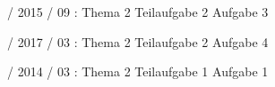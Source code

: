 \documentclass{lehramt-informatik}
\begin{document}
%

 / 2015 / 09 : Thema 2 Teilaufgabe 2 Aufgabe 3

%

 / 2017 / 03 : Thema 2 Teilaufgabe 2 Aufgabe 4

%

 / 2014 / 03 : Thema 2 Teilaufgabe 1 Aufgabe 1

\literatur
\end{document}
